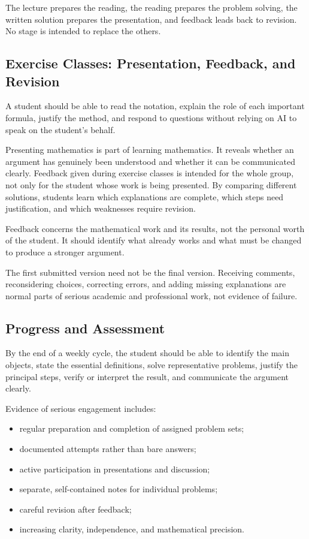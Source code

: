The lecture prepares the reading, the reading prepares the problem solving, the
written solution prepares the presentation, and feedback leads back to revision.
No stage is intended to replace the others.

\subsection*{Exercise Classes: Presentation, Feedback, and Revision}

A student should be able to read the notation, explain the role of each important
formula, justify the method, and respond to questions without relying on AI to
speak on the student's behalf.

Presenting mathematics is part of learning mathematics. It reveals whether an
argument has genuinely been understood and whether it can be communicated
clearly. Feedback given during exercise classes is intended for the whole group,
not only for the student whose work is being presented. By comparing different
solutions, students learn which explanations are complete, which steps need
justification, and which weaknesses require revision.

Feedback concerns the mathematical work and its results, not the personal worth
of the student. It should identify what already works and what must be changed to
produce a stronger argument.

The first submitted version need not be the final version. Receiving comments,
reconsidering choices, correcting errors, and adding missing explanations are
normal parts of serious academic and professional work, not evidence of failure.

\subsection*{Progress and Assessment}

By the end of a weekly cycle, the student should be able to identify the main
objects, state the essential definitions, solve representative problems, justify
the principal steps, verify or interpret the result, and communicate the argument
clearly.

Evidence of serious engagement includes:
\begin{itemize}
    \item regular preparation and completion of assigned problem sets;
    \item documented attempts rather than bare answers;
    \item active participation in presentations and discussion;
    \item separate, self-contained notes for individual problems;
    \item careful revision after feedback;
    \item increasing clarity, independence, and mathematical precision.
\end{itemize}

